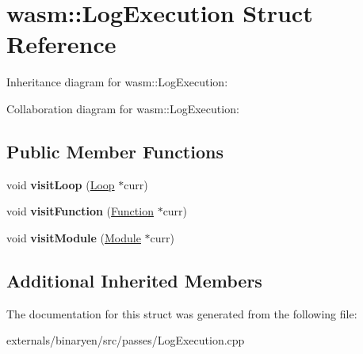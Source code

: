 \hypertarget{structwasm_1_1_log_execution}{}\section{wasm\+:\+:Log\+Execution Struct Reference}
\label{structwasm_1_1_log_execution}


Inheritance diagram for wasm\+:\+:Log\+Execution\+:


Collaboration diagram for wasm\+:\+:Log\+Execution\+:
\subsection*{Public Member Functions}
\begin{DoxyCompactItemize}
\item 
\mbox{\label{structwasm_1_1_log_execution_af93e910efd410ca10f9765124dc5e18c}} 
void {\bfseries visit\+Loop} (\mbox{\hyperlink{classwasm_1_1_loop}{Loop}} $\ast$curr)
\item 
\mbox{\label{structwasm_1_1_log_execution_aca4663095ac06193fa73ace085d450ee}} 
void {\bfseries visit\+Function} (\mbox{\hyperlink{classwasm_1_1_function}{Function}} $\ast$curr)
\item 
\mbox{\label{structwasm_1_1_log_execution_adb299a48e7426508fecaaba9864cb478}} 
void {\bfseries visit\+Module} (\mbox{\hyperlink{classwasm_1_1_module}{Module}} $\ast$curr)
\end{DoxyCompactItemize}
\subsection*{Additional Inherited Members}


The documentation for this struct was generated from the following file\+:\begin{DoxyCompactItemize}
\item 
externals/binaryen/src/passes/Log\+Execution.\+cpp\end{DoxyCompactItemize}
